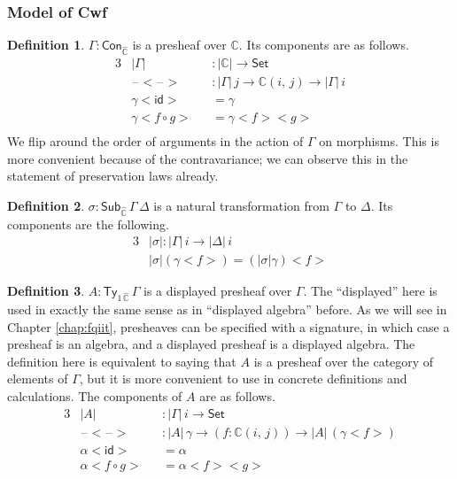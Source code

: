 \documentclass[12pt,a4paper,twoside,openany]{book}
\theoremstyle{remark}
\theoremstyle{definition}
\newtheorem{mydefinition}{Definition}
\newcommand{\mbb}[1]{\mathbb{#1}}
\newcommand{\id}{\mathsf{id}}
\newcommand{\Con}{\mathsf{Con}}
\newcommand{\Sub}{\mathsf{Sub}}
\newcommand{\Ty}{\mathsf{Ty}}
\newcommand{\blank}{\mathord{\hspace{1pt}\text{--}\hspace{1pt}}}
\newcommand{\Set}{\mathsf{Set}}
\newcommand{\mbbC}{\mbb{C}}
\newcommand{\hmbbC}{\hat{\mbb{C}}}
\newcommand{\lab}{<\!}
\newcommand{\rab}{\!>}
\begin{document}
\subsubsection{Model of Cwf}

\begin{mydefinition}
$\Gamma : \Con_{\hmbbC}$ is a presheaf over $\mbbC$. Its components
are as follows.
\begin{alignat*}{3}
  & |\Gamma|             &&: |\mbbC| \to \Set \\
  & \blank\lab\blank\rab &&: |\Gamma|\,j \to \mbbC(i,\,j) \to |\Gamma|\,i\\
  & \gamma\lab\id\rab &&= \gamma \\
  & \gamma\lab f\circ g\rab &&= \gamma \lab f \rab \lab g \rab \\
\end{alignat*}
We flip around the order of arguments in the action of $\Gamma$ on
morphisms. This is more convenient because of the contravariance; we can
observe this in the statement of preservation laws already.
\end{mydefinition}

\begin{mydefinition}
$\sigma : \Sub_{\hmbbC}\,\Gamma\,\Delta$ is a natural transformation from $\Gamma$ to $\Delta$. Its components are the following.
\begin{alignat*}{3}
  & |\sigma| : |\Gamma|\,i \to |\Delta|\,i \\
  & |\sigma|(\gamma\lab f \rab) = (|\sigma|\gamma)\lab f \rab
\end{alignat*}
\end{mydefinition}

\begin{mydefinition}
$A : \Ty_{1\,\hmbbC}\,\Gamma$ is a displayed presheaf over $\Gamma$. The
``displayed'' here is used in exactly the same sense as in ``displayed
algebra'' before. As we will see in Chapter \ref{chap:fqiit}, presheaves can be
specified with a signature, in which case a presheaf is an algebra, and a
displayed presheaf is a displayed algebra. The definition here is equivalent
to saying that $A$ is a presheaf over the category of elements of $\Gamma$,
but it is more convenient to use in concrete definitions and calculations. The
components of $A$ are as follows.
\begin{alignat*}{3}
  &|A| &&: |\Gamma|\,i \to \Set\\
  &\blank\lab\blank\rab &&: |A|\,\gamma \to (f : \mbbC(i,\,j)) \to |A|\,(\gamma\lab f \rab)\\
  & \alpha\lab\id\rab &&= \alpha \\
  & \alpha\lab f\circ g\rab &&= \alpha \lab f \rab \lab g \rab
\end{alignat*}
\end{mydefinition}
\end{document}
